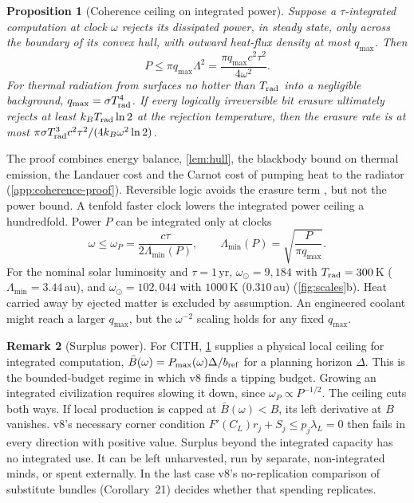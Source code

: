 \documentclass[11pt,a4paper]{article}
\newtheorem{proposition}{Proposition}
\theoremstyle{definition}
\newtheorem{remark}[proposition]{Remark}
\newcommand{\CITH}{\textsc{CITH}}
\newcommand{\Lmin}{\Lambda_{\min}}
\begin{document}
\begin{proposition}[Coherence ceiling on integrated power]
\label{prop:coherence}
Suppose a $\tau$-integrated computation at clock $\omega$ rejects its
dissipated power, in steady state, only across the boundary of its convex
hull, with outward heat-flux density at most $q_{\max}$. Then
\begin{equation}
 P\leq\pi q_{\max}\Lambda^2=\frac{\pi q_{\max}c^2\tau^2}{4\omega^2}.
 \label{eq:coherence}
\end{equation}
For thermal radiation from surfaces no hotter than $T_{\rm rad}$ into a
negligible background, $q_{\max}=\sigma T_{\rm rad}^4$. If every logically
irreversible bit erasure ultimately rejects at least $k_BT_{\rm rad}\ln2$ at the
rejection temperature, then the erasure rate is at most
$\pi\sigma T_{\rm rad}^3c^2\tau^2/(4k_B\omega^2\ln2)$.
\end{proposition}
\noindent The proof combines energy balance, \cref{lem:hull}, the blackbody
bound on thermal emission, the Landauer cost \citep{Landauer1961} and the
Carnot cost of pumping heat to the radiator (\cref{app:coherence-proof}).
Reversible logic avoids the erasure term \citep{Bennett1982}, but not the power
bound. A tenfold faster clock lowers the integrated power ceiling a
hundredfold. Power $P$ can be integrated only at clocks
\begin{equation}
 \omega\leq\omega_P=\frac{c\tau}{2\Lmin(P)},\qquad
 \Lmin(P)=\sqrt{\frac{P}{\pi q_{\max}}}.
 \label{eq:omega-P}
\end{equation}
For the nominal solar luminosity \citep{IAU2015} and $\tau=1\,$yr,
$\omega_\odot=9{,}184$ with $T_{\rm rad}=300\,$K ($\Lmin=3.44\,$au), and
$\omega_\odot=102{,}044$ with $1000\,$K ($0.310\,$au)
(\cref{fig:scales}b). Heat carried away by ejected matter is excluded by
assumption. An engineered coolant might reach a larger $q_{\max}$, but the
$\omega^{-2}$ scaling holds for any fixed $q_{\max}$.

\begin{remark}[Surplus power]
\label{rem:surplus}
For \CITH, \cref{prop:coherence} supplies a physical local ceiling for
integrated computation, $\bar B(\omega)=P_{\max}(\omega)\Delta/b_{\rm ref}$
for a planning horizon $\Delta$. This is the bounded-budget regime in which v8
finds a tipping budget. Growing an integrated civilization requires slowing
it down, since $\omega_P\propto P^{-1/2}$. The ceiling cuts both ways. If local
production is capped at $\bar B(\omega)<B$, its left derivative at $B$ vanishes.
v8's necessary corner condition $F'(C_L)r_j+S_j\leq p_j\lambda_L=0$ then fails in
every direction with positive value. Surplus beyond the integrated capacity
has no integrated use. It can be left unharvested, run by separate,
non-integrated minds, or spent externally. In the last case v8's no-replication
comparison of substitute bundles (Corollary~21) decides whether that spending
replicates.
\end{remark}
\end{document}
